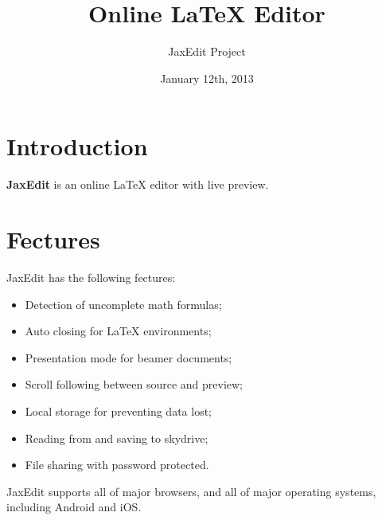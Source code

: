 \documentclass{article}
\begin{document}
\title{Online LaTeX Editor}
\author{JaxEdit Project}
\date{January 12th, 2013}
\maketitle

\tableofcontents

\section{Introduction}

\textbf{JaxEdit} is an online LaTeX editor with live preview.

\section{Fectures}

JaxEdit has the following fectures:

\begin{itemize}
\item Detection of uncomplete math formulas;
\item Auto closing for LaTeX environments;
\item Presentation mode for beamer documents;
\item Scroll following between source and preview;
\item Local storage for preventing data lost;
\item Reading from and saving to skydrive;
\item File sharing with password protected.
\end{itemize}

JaxEdit supports all of major browsers, and all of major operating systems, including Android and iOS.
\end{document}
